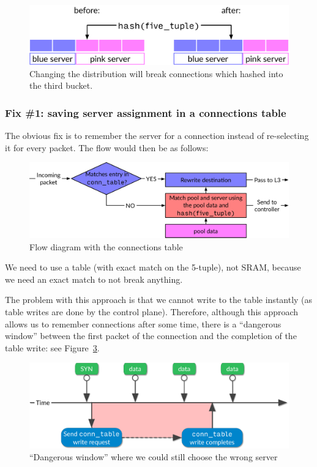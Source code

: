 \documentclass[11pt,oneside,a4paper]{article}
\begin{document}
\begin{figure}[h]
\centering
\includegraphics[width=.5\textwidth]{figures/hash-problem.pdf}
\caption{Changing the distribution will break connections which hashed into the
    third bucket.}
\label{fig:hash-problem}
\end{figure}

\subsubsection{Fix \#1: saving server assignment in a connections table}

The obvious fix is to remember the server for a connection instead of
re-selecting it for every packet.
The flow would then be as follows:

\begin{figure}[h]
\centering
\includegraphics[width=.7\textwidth]{figures/connections.pdf}
\caption{Flow diagram with the connections table}
\label{fig:connections}
\end{figure}

We need to use a table (with exact match on the 5-tuple), not SRAM, because we
need an exact match to not break anything.

The problem with this approach is that we cannot write to the table instantly
(as table writes are done by the control plane).
Therefore, although this approach allows us to remember connections after some
time, there is a ``dangerous window'' between the first packet of the connection
and the completion of the table write: see Figure~\ref{fig:timeline}.

\begin{figure}[h]
\centering
\includegraphics[width=.7\textwidth]{figures/timeline.pdf}
\caption{``Dangerous window'' where we could still choose the wrong
    server}
\label{fig:timeline}
\end{figure}
\end{document}
